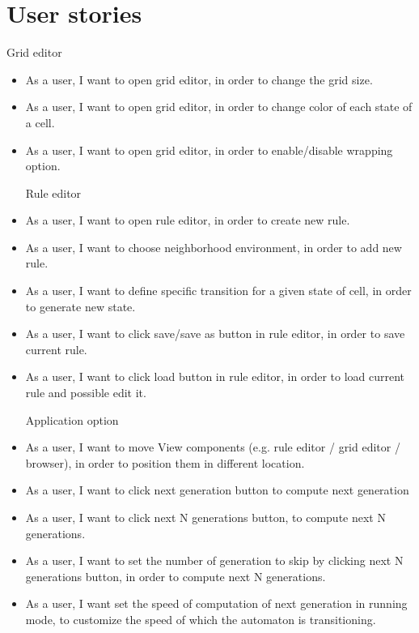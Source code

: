 \documentclass{article}
\begin{document}
\section{User stories}
	Grid editor
\begin{itemize}	
	\item 
		As a user, 
		I want to open grid editor,
		in order to change the grid size.

	\item 
		As a user, 
		I want to open grid editor,
		in order to change color of each state of a cell.

	\item 
		As a user, 
		I want to open grid editor,
		in order to enable/disable wrapping option.

	\vspace{30pt}
	Rule editor
	
	\item 
		As a user,
		I want to open rule editor,
		in order to create new rule.
		
	\item 
		As a user,
		I want to choose neighborhood environment,
		in order to add new rule.
		
	\item 
		As a user,
		I want to define specific transition for a given state of cell,
		in order to generate new state.
		
	\item 
		As a user,
		I want to click save/save as button in rule editor,
		in order to save current rule.

	\item 
		As a user,
		I want to click load button in rule editor,
		in order to load current rule and possible edit it.

	\vspace{30pt}
	Application option
	
	\item 
		As a user,
		I want to move View components (e.g. rule editor / grid editor / browser),
		in order to position them in different location.
	\item 
		As a user,
		I want to click next generation button 
		to compute next generation
	\item 
		As a user,
		I want to click next N generations button,
		to compute next N generations.
	\item 
		As a user,
		I want to set the number of generation to skip by clicking next N generations button,
		in order to compute next N generations.
	\item 
		As a user,
		I want set the speed of computation of next generation in running mode,
		to customize the speed of which the automaton is transitioning.

\end{itemize}
\end{document}

